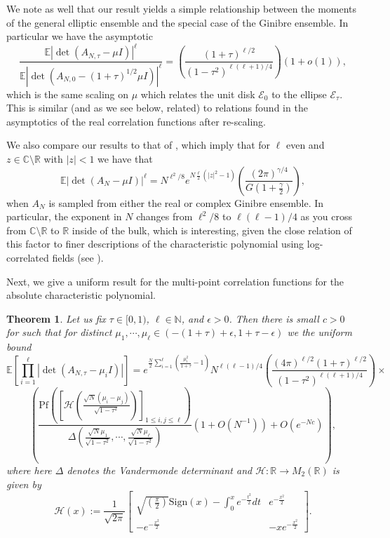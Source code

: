\documentclass[12pt]{article}
\newcommand{\N}{\mathbb{N}}
\newcommand{\R}{\mathbb{R}}
\newcommand{\C}{\mathbb{C}}
\newcommand{\E}{\mathbb{E}}
\newtheorem{theorem}[info]{Theorem}
\numberwithin{info}{section}
\numberwithin{equation}{section}
\renewcommand{\[}{\begin{equation}}
\renewcommand{\]}{\end{equation}}
\renewcommand{\cal}{\mathcal}
\newcommand{\sign}{\mathrm{Sign}}
\newcommand{\<}{\langle}
\renewcommand{\>}{\rangle}
\newcommand{\pf}{\mathrm{Pf}}
\renewcommand{\l}{\left}
\renewcommand{\r}{\right}
\begin{document}
	We note as well that our result yields a simple relationship between the moments of the general elliptic ensemble and the special case of the Ginibre ensemble. In particular we have the asymptotic
	\[\frac{\E|\det(A_{N,\tau}-\mu I)|^{\ell}}{\E|\det(A_{N,0}-(1+\tau)^{1/2}\mu I)|^{\ell}}=\left(\frac{(1+\tau)^{\ell/2}}{(1-\tau^2)^{\ell(\ell+1)/4}}\right)(1+o(1)),\]
	which is the same scaling on $\mu$ which relates the unit disk $\cal{E}_0$ to the ellipse $\cal{E}_\tau$. This is similar (and as we see below, related) to relations found in the asymptotics of the real correlation functions after re-scaling.
	
	We also compare our results to that of \cite{afanasievinterpolate,afanasievComplex}, which imply that for $\ell$ even and $z\in \C\setminus\R$ with $|z|<1$ we have that
	\[\E |\det(A_{N}-\mu I)|^{\ell}=N^{\ell^2/8}e^{N\frac{\ell}{2}\left(|z|^2-1\right)}\left(\frac{(2\pi)^{\gamma/4}}{G\left(1+\frac{\gamma}{2}\right)}\right),\]
	when $A_N$ is sampled from either the real or complex Ginibre ensemble. In particular, the exponent in $N$ changes from $\ell^2/8$ to $\ell(\ell-1)/4$ as you cross from $\C\setminus \R$ to $\R$ inside of the bulk, which is interesting, given the close relation of this factor to finer descriptions of the characteristic polynomial using log-correlated fields (see \cite{fyo-keating}).
	
	Next, we give a uniform result for the multi-point correlation functions for the absolute characteristic polynomial.
	
	\begin{theorem}
		\label{theorem: real bulk multi point}
		Let us fix $\tau\in [0,1)$, $\ell\in \N$, and $\epsilon>0$. Then there is small $c>0$ for such that for distinct $\mu_1,\cdots,\mu_{\ell}\in (-(1+\tau)+\epsilon,1+\tau-\epsilon)$ we the uniform bound
		\[
		\E\left[\prod_{i=1}^{\ell}\left|\det(A_{N,\tau}-\mu_i I)\right|\right]=e^{\frac{N }{2} \sum_{i=1}^{\ell}\left(\frac{\mu_i^2}{1+\tau}-1\right)}N^{\ell(\ell-1)/4}\left(\frac{(4\pi)^{\ell/2}(1+\tau)^{\ell/2}}{(1-\tau^2)^{\ell(\ell+1)/4}}\right)\times\]
		\[\left(\frac{\pf\l(\l[\cal{H}\l(\frac{\sqrt{N}\left(\mu_i-\mu_j\right)}{\sqrt{1-\tau^2}}\r)\r]_{1\le i,j\le \ell}\r)}{\Delta\left(\frac{\sqrt{N}\mu_1}{\sqrt{1-\tau^2}},\cdots,\frac{\sqrt{N}\mu_\ell}{\sqrt{1-\tau^2}}\right)}\l(1+O(N^{-1})\r)+O(e^{-Nc})\right),
		\]
		where here $\Delta$ denotes the Vandermonde determinant and $\cal{H}:\R \to M_2(\R)$ is given by  
		\[\cal{H}(x):=\frac{1}{\sqrt{2\pi}}\begin{bmatrix}
			\sqrt{\left(\frac{\pi}{2}\right)}\sign(x)-\int_0^x e^{-\frac{t^2}{2}}dt&  e^{-\frac{x^2}{2}}\\
			- e^{-\frac{x^2}{2}}& -x e^{-\frac{x^2}{2}}
		\end{bmatrix}.\label{eqn:def:H-kernel}\]
	\end{theorem}
	
\end{document}
